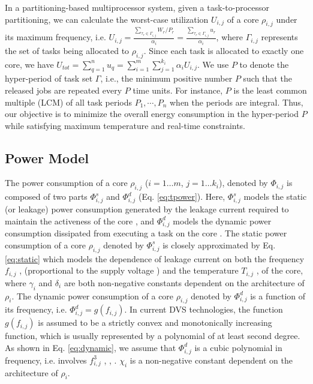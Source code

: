 \documentclass[conference]{IEEEtran}
\begin{document}
%
%
In a partitioning-based multiprocessor system, given a task-to-processor partitioning, we can calculate the worst-case utilization $U_{i,j}$ of a core $\rho_{i,j}$ under its maximum frequency, i.e. $U_{i,j}=\frac{\sum_{\tau_r \in  \Gamma_{i,j}} W_r/P_r}{\alpha_i}=\frac{\sum_{\tau_r \in  \Gamma_{i,j}} u_r}{\alpha_i}$, where $\Gamma_{i,j}$ represents the set of tasks being allocated to $\rho_{i,j}$. Since each task is allocated to exactly one core, we have $U_{tot} = \sum_{q=1}^{n} u_q = \sum_{i=1}^{m} \sum_{j=1}^{k_i} \alpha_i U_{i,j}$.
We use $P$ to denote the hyper-period of task set $\Gamma$, i.e., the minimum positive number $P$ such that the released jobs are repeated every $P$ time units. For instance, $P$ is the least common multiple (LCM) of all task periods $P_1, \cdots, P_n$ when the periods are integral.
Thus, our objective is to minimize the overall energy consumption in the hyper-period $P$ while satisfying maximum temperature and real-time constraints.

\subsection{Power Model}
\label{power-model}

The power consumption of a core $\rho_{i,j}$  ($i=1\ldots m$, $j=1\ldots k_i$), denoted by $\Phi_{i,j}$ is composed of two
parts $\Phi^{s}_{i,j}$ and $\Phi^{d}_{i,j}$ (Eq. \ref{eq:tpower}). Here, $\Phi^{s}_{i,j}$ models the static
(or leakage) power consumption
generated by the leakage current required to maintain the activeness of the core \cite{Chen09,Langen06}, and
$\Phi^{d}_{i,j}$ models the dynamic power
consumption dissipated from executing a task on the core \cite{Aydin03}.
The static power consumption of a core $\rho_{i,j}$ denoted by  $\Phi^{s}_{i,j}$
is closely approximated  by Eq. \ref{eq:static} which models the dependence of leakage current on both the frequency $f_{i,j}$
\cite{Chantem10}, \cite{Fisher09} (proportional to the supply voltage \cite{Chaturvedi10})
and the temperature $T_{i,j}$ \cite{Quan10}, \cite{Chaturvedi10} of the core,
where $\gamma_i$ and $\delta_i$ are both non-negative constants dependent on the architecture of $\rho_i$. The dynamic power consumption of a core $\rho_{i,j}$ denoted by  $\Phi^{d}_{i,j}$
is a function of its frequency, i.e. $\Phi^{d}_{i,j} = g(f_{i,j})$.
In current DVS technologies, the function $g(f_{i,j})$ is assumed to be a strictly convex and monotonically increasing function,
which is usually represented by a polynomial of at least second degree.
As shown in Eq. \ref{eq:dynamic}, we assume that $\Phi^{d}_{i,j}$ is a cubic polynomial in frequency, i.e. involves $f_{i,j}^3$
\cite{Chantem10}, \cite{Quan10}, \cite{Fisher09}.
$\chi_i$ is a non-negative constant
dependent on the architecture of $\rho_i$.
\end{document}
